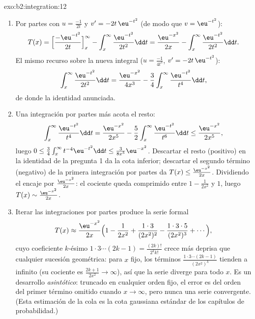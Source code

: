 \begin{solution}{exo:b2:integration:12}
\begin{enumerate}
  \item Por partes con $u = \frac{-1}{2t}$ y $v' = -2t\,\eu^{-t^2}$
        (de modo que $v = \eu^{-t^2}$):
        \[
        T(x) = \Bigl[\frac{-\eu^{-t^2}}{2t}\Bigr]_x^\infty
        - \int_x^\infty \frac{\eu^{-t^2}}{2t^2}\dd t
        = \frac{\eu^{-x^2}}{2x}
        - \int_x^\infty \frac{\eu^{-t^2}}{2t^2}\dd t .
        \]
        El mismo recurso sobre la nueva integral ($u =
        \frac{-1}{4t^3}$, $v' = -2t\,\eu^{-t^2}$):
        \[
        \int_x^\infty \frac{\eu^{-t^2}}{2t^2}\dd t
        = \frac{\eu^{-x^2}}{4x^3}
        - \frac34\int_x^\infty \frac{\eu^{-t^2}}{t^4}\dd t ,
        \]
        de donde la identidad anunciada.
  \item Una integración por partes más acota el resto:
        \[
        \int_x^\infty \frac{\eu^{-t^2}}{t^4}\dd t
        = \frac{\eu^{-x^2}}{2x^5}
        - \frac52\int_x^\infty\frac{\eu^{-t^2}}{t^6}\dd t
        \leq \frac{\eu^{-x^2}}{2x^5},
        \]
        luego $0 \leq \frac34\int_x^\infty t^{-4}\eu^{-t^2}\dd t
        \leq \frac{3}{8x^5}\eu^{-x^2}$. Descartar el resto
        (positivo) en la identidad de la pregunta 1 da la cota
        inferior; descartar el segundo término (negativo) de la
        primera integración por partes da $T(x) \leq
        \frac{\eu^{-x^2}}{2x}$. Dividiendo el encaje por
        $\frac{\eu^{-x^2}}{2x}$: el cociente queda comprimido entre
        $1 - \frac{1}{2x^2}$ y $1$, luego $T(x) \sim
        \frac{\eu^{-x^2}}{2x}$.
  \item Iterar las integraciones por partes produce la serie
        formal
        \[
        T(x) \approx \frac{\eu^{-x^2}}{2x}\Bigl(1 -
        \frac{1}{2x^2} + \frac{1\cdot3}{(2x^2)^2} -
        \frac{1\cdot3\cdot5}{(2x^2)^3} + \cdots\Bigr),
        \]
        cuyo coeficiente $k$-ésimo $1\cdot3\cdots(2k-1) =
        \frac{(2k)!}{2^k k!}$ crece más deprisa que cualquier
        sucesión geométrica: para $x$ fijo, los términos
        $\frac{1\cdot3\cdots(2k-1)}{(2x^2)^k}$ tienden a infinito
        (su cociente es $\frac{2k+1}{2x^2} \to \infty$), así que la
        serie diverge para todo $x$. Es un desarrollo
        \emph{asintótico}: truncado en cualquier orden fijo, el
        error es del orden del primer término omitido cuando $x \to
        \infty$, pero nunca una serie convergente. (Esta estimación
        de la cola es la cota gaussiana estándar de los capítulos de
        probabilidad.)
\end{enumerate}
\end{solution}

